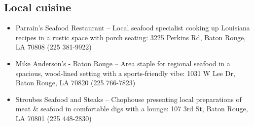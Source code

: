 \documentclass[12pt,letterpaper]{book}
\begin{document}
\subsection*{Local cuisine}

\begin{itemize}
\item Parrain's Seafood Restaurant -- Local seafood specialist cooking up Louisiana recipes in a rustic space with porch seating: 3225 Perkins Rd, Baton Rouge, LA 70808 (225 381-9922)
\item Mike Anderson's - Baton Rouge -- Area staple for regional seafood in a spacious, wood-lined setting with a sports-friendly vibe: 1031 W Lee Dr, Baton Rouge, LA 70820 (225 766-7823)
\item Stroubes Seafood and Steaks -- Chophouse presenting local preparations of meat \& seafood in comfortable digs with a lounge: 107 3rd St, Baton Rouge, LA 70801 (225 448-2830)
\end{itemize}


\backmatter
\renewcommand{\indexname}{Author Index}
\printindex
\vspace{2cm}
\doclicenseThis 
\end{document}

